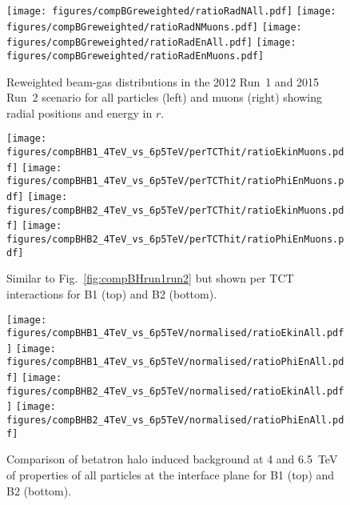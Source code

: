 \begin{figure}%
\centering
\texttt{[image: figures/compBGreweighted/ratioRadNAll.pdf]}
\texttt{[image: figures/compBGreweighted/ratioRadNMuons.pdf]}
\texttt{[image: figures/compBGreweighted/ratioRadEnAll.pdf]}
\texttt{[image: figures/compBGreweighted/ratioRadEnMuons.pdf]}
\caption{Reweighted beam-gas distributions in the 2012 Run~1 and 2015 Run~2 scenario for all particles (left) and muons (right) showing radial positions and energy in $r$.
  \label{fig:compBGreweighted2}}
\end{figure}



\begin{figure}
  \begin{center}
  \texttt{[image: figures/compBHB1\_4TeV\_vs\_6p5TeV/perTCThit/ratioEkinMuons.pdf]}
  \texttt{[image: figures/compBHB1\_4TeV\_vs\_6p5TeV/perTCThit/ratioPhiEnMuons.pdf]}
  \texttt{[image: figures/compBHB2\_4TeV\_vs\_6p5TeV/perTCThit/ratioEkinMuons.pdf]}
  \texttt{[image: figures/compBHB2\_4TeV\_vs\_6p5TeV/perTCThit/ratioPhiEnMuons.pdf]}
\end{center}
\vspace{-0.6cm}
 \caption{Similar to Fig.~\ref{fig:compBHrun1run2} but shown per TCT interactions for B1 (top) and B2 (bottom).
  \label{fig:compBHrun1run2PerTCT}}
\end{figure}



\begin{figure}%
\begin{center}
  \texttt{[image: figures/compBHB1\_4TeV\_vs\_6p5TeV/normalised/ratioEkinAll.pdf]}
  \texttt{[image: figures/compBHB1\_4TeV\_vs\_6p5TeV/normalised/ratioPhiEnAll.pdf]}
  \texttt{[image: figures/compBHB2\_4TeV\_vs\_6p5TeV/normalised/ratioEkinAll.pdf]}
  \texttt{[image: figures/compBHB2\_4TeV\_vs\_6p5TeV/normalised/ratioPhiEnAll.pdf]}
\end{center}
\vspace{-0.6cm}
 \caption{Comparison of betatron halo induced background at 4 and 6.5~TeV of properties of all particles at the interface plane for B1 (top) and B2 (bottom).
  \label{compBHrun1run22}}
\end{figure}



